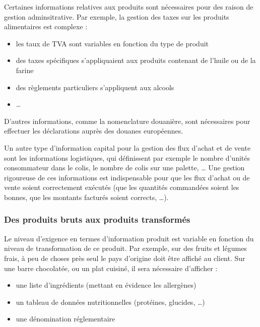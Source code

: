                 Certaines informations relatives aux produits sont nécessaires pour des raison de gestion adminsitrative.
                Par exemple, la gestion des taxes sur les produits alimentaires est complexe : 
                \begin{itemize}
                    \item les taux de TVA sont variables en fonction du type de produit
                    \item des taxes spécifiques s'appliquaient aux produits contenant de l'huile ou de la farine
                    \item des règlements particuliers s'appliquent aux alcools
                    \item \dots
                \end{itemize}
                D'autres informations, comme la nomenclature douanière, sont nécessaires pour effectuer les déclarations auprès des douanes européennes.

                Un autre type d'information capital pour la gestion des flux d'achat et de vente sont les informations logistiques, qui définissent par exemple le nombre d'unités consommateur dans le colis, le nombre de colis sur une palette, \dots
                Une gestion rigoureuse de ces informations est indispensable pour que les flux d'achat ou de vente soient correctement exécutés (que les quantités commandées soient les bonnes, que les montants facturés soient corrects, \dots).

            \subsubsection{Des produits bruts aux produits transformés}

            Le niveau d'exigence en termes d'information produit est variable en fonction du niveau de transformation de ce produit.
            Par exemple, sur des fruits et légumes frais, à peu de choses près seul le pays d'origine doit être affiché au client.
            Sur une barre chocolatée, ou un plat cuisiné, il sera nécessaire d'afficher :
            \begin{itemize}
                 \item une liste d'ingrédients (mettant en évidence les allergènes)
                 \item un tableau de données nutritionnelles (protéines, glucides, \dots)
                 \item une dénomination réglementaire
            \end{itemize}

